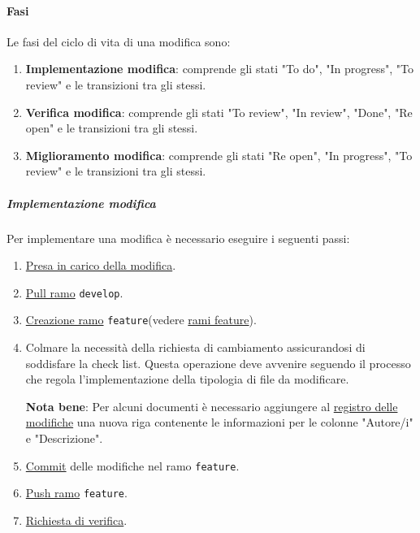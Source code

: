 \paragraph{Fasi}
Le fasi del ciclo di vita di una modifica sono:
\begin{enumerate}
    \item \textbf{Implementazione modifica}: comprende gli stati "To do", "In progress", "To review" e le transizioni tra gli stessi.

    \item \textbf{Verifica modifica}: comprende gli stati "To review", "In review", "Done", "Re open" e le transizioni tra gli stessi.
    
  
    \item \textbf{Miglioramento modifica}: comprende gli stati "Re open", "In progress", "To review" e le transizioni tra gli stessi. 
  
\end{enumerate}

\subparagraph{Implementazione modifica}
Per implementare una modifica è necessario eseguire i seguenti passi:
\begin{enumerate}
\item \hyperref[subpar:presa_carico_modifica]{Presa in carico della modifica}.

\item \hyperref[subpar:pull]{Pull ramo} \texttt{develop}.

\item \hyperref[subpar:branch]{Creazione ramo} \texttt{feature}(vedere \hyperref[item:rami_feature]{rami feature}).

\item Colmare la necessità della richiesta di cambiamento assicurandosi di soddisfare la check list.
Questa operazione deve avvenire seguendo il processo che regola l'implementazione della tipologia di file da modificare.

\textbf{Nota bene}: Per alcuni documenti è necessario aggiungere al \hyperref[par:registro_delle_modifiche]{registro delle modifiche} una nuova riga contenente le informazioni per le colonne "Autore/i" e "Descrizione". 

\item \hyperref[subpar:commit]{Commit} delle modifiche nel ramo \texttt{feature}.

\item \hyperref[subpar:push]{Push ramo} \texttt{feature}.

\item \hyperref[subpar:github_richiesta_di_verifica]{Richiesta di verifica}.

\end{enumerate}

